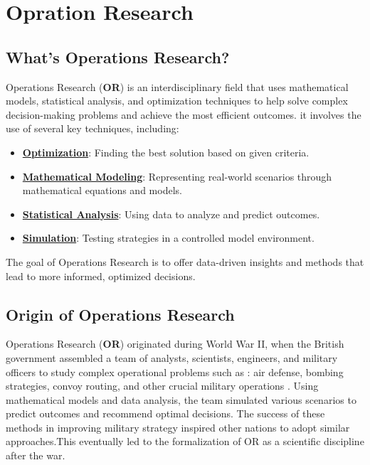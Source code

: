 \section{Opration Research}
\subsection{What's Operations Research?}
\begin{tcolorbox}[title=Definition]
Operations Research (\textbf{OR}) is an interdisciplinary field that uses mathematical models, statistical analysis, 
and optimization techniques to help solve complex decision-making problems and achieve the most efficient outcomes.
\noindent it involves the use of several key techniques, including:

\begin{itemize}
    \item \textbf{\underline{Optimization}}: Finding the best solution based on given criteria.
    \item \textbf{\underline{Mathematical Modeling}}: Representing real-world scenarios through mathematical equations and models.
    \item \textbf{\underline{Statistical Analysis}}: Using data to analyze and predict outcomes.
    \item \textbf{\underline{Simulation}}: Testing strategies in a controlled model environment.
\end{itemize}
The goal of Operations Research is to offer data-driven insights and methods that lead to more informed, optimized decisions.
\end{tcolorbox}

\subsection{Origin of Operations Research}

\begin{tcolorbox}[title=Origin]
Operations Research (\textbf{OR}) originated during World War II, when the British government assembled a team of analysts, 
scientists, engineers, and military officers to study complex operational problems such as : air defense, bombing strategies, 
convoy routing, and other crucial military operations . Using mathematical models and data analysis, the team simulated various scenarios 
to predict outcomes and recommend optimal decisions. The success of these methods in improving military strategy inspired 
other nations to adopt similar approaches.This eventually led to the formalization of OR as a scientific discipline after the war.
\end{tcolorbox}

